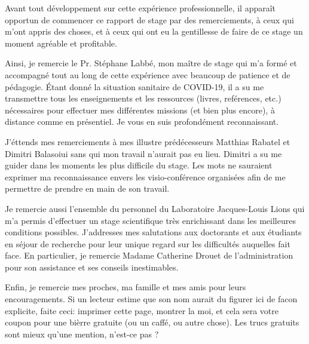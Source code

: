 \documentclass[ 
11pt, %
french, %
singlespacing, %
parskip, %
headsepline, %
openany, %
]{MastersDoctoralThesis} %
\theoremstyle{plain}
\numberwithin{theorem}{section}  %
\begin{document}
\begin{acknowledgements}
\addchaptertocentry{\acknowledgementname} %



\vspace*{1cm}

\hspace{12pt} Avant tout développement sur cette expérience professionnelle, il apparaît opportun de commencer ce rapport de stage par des remerciements, à ceux qui m’ont appris des choses, et à ceux qui ont eu la gentillesse de faire de ce stage un moment agréable et profitable.

\hspace{12pt} Ainsi, je remercie le Pr. Stéphane Labbé, mon maître de stage qui m’a formé et accompagné tout au long de cette expérience avec beaucoup de patience et de pédagogie. Étant donné la situation sanitaire de COVID-19, il a su me transmettre tous les enseignements et les ressources (livres, reférences, etc.) nécessaires pour effectuer mes différentes missions (et bien plus encore), à distance comme en présentiel. Je vous en suis profondément reconnaissant.

\hspace{12pt} J'éttends mes remerciements à mes illustre prédécesseurs Matthias Rabatel et Dimitri Balasoiui sans qui mon travail n'aurait pas eu lieu. Dimitri a su me guider dans les moments les plus difficile du stage. Les mots ne sauraient exprimer ma reconnaissance envers les visio-conférence organisées afin de me permettre de prendre en main de son travail.

\hspace{12pt} Je remercie aussi l'ensemble du personnel du Laboratoire Jacques-Louis Lions qui m’a permis d’effectuer un stage scientifique très enrichissant dans les meilleures conditions possibles. J'addresses mes salutations aux doctorants et aux étudiants en séjour de recherche pour leur unique regard sur les difficultés auquelles fait face. En particulier, je remercie Madame Catherine Drouet de l'administration pour son assistance et ses conseils inestimables.

\hspace{12pt} Enfin, je remercie mes proches, ma famille et mes amis pour leurs encouragements. Si un lecteur estime que son nom aurait du figurer ici de facon explicite, faite ceci: imprimer cette page, montrer la moi, et cela sera votre coupon pour une bièrre gratuite (ou un caffé, ou autre chose). Les trucs gratuits sont mieux qu'une mention, n'est-ce pas ?

\end{acknowledgements}
\end{document}
